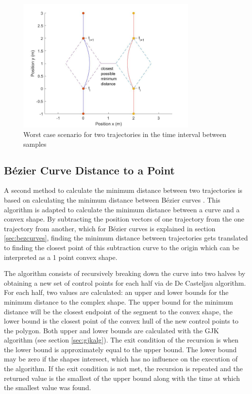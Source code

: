 \begin{figure}
\centering
\includegraphics[width=0.8\textwidth]{Images/theworstcasescenario.jpg}
\caption{Worst case scenario for two trajectories in the time interval between samples}
\label{fig:theworstcasescenario}
\end{figure}


\subsection{Bézier Curve Distance to a Point}
\label{sec:bezcurvetopoint}

\par A second method to calculate the minimum distance between two trajectories is based on calculating the minimum distance between Bézier curves \cite{chang2011computation}. This algorithm is adapted to calculate the minimum distance between a curve and a convex shape. By subtracting the position vectors of one trajectory from the one trajectory from another, which for Bézier curves is explained in section \ref{sec:bezcurves}, finding the minimum distance between trajectories gets translated to finding the closest point of this subtraction curve to the origin which can be interpreted as a 1 point convex shape.
\par The algorithm consists of recursively breaking down the curve into two halves by obtaining a new set of control points for each half via de De Casteljau algorithm. For each half, two values are calculated: an upper and lower bounds for the minimum distance to the complex shape. The upper bound for the minimum distance will be the closest endpoint of the segment to the convex shape, the lower bound is the closest point of the convex hull of the new control points to the polygon. Both upper and lower bounds are calculated with the \acs{GJK} algorithm (see section \ref{sec:gjkalg}). The exit condition of the recursion is when the lower bound is approximately equal to the upper bound. The lower bound may be zero if the shapes intersect, which has no influence on the execution of the algorithm. If the exit condition is not met, the recursion is repeated and the returned value is the smallest of the upper bound along with the time at which the smallest value was found.

